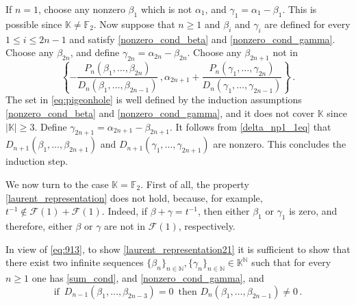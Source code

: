 \documentclass[a4paper,12pt]{article}
\def\bbf{\mathbb{F}}
\def\fq{\bbk}
\def\bbn{\mathbb{N}}
\def\bbk{\mathbb{K}}
\def\calf{\mathcal{F}}
\newcommand{\HankelPolynomial}{D}
\begin{document}
If $n=1$, choose any nonzero $\beta_1$ which is not $\alpha_1$, and $\gamma_1=\alpha_1-\beta_1$. This is possible since $\fq\neq\bbf_2$. Now 
suppose that $n\geq1$ and $\beta_i$ and $\gamma_i$ are defined for every $1\le i\le 2n-1$ and satisfy \eqref{nonzero_cond_beta} and \eqref{nonzero_cond_gamma}. Choose any $\beta_{2n}$, and define $\gamma_{2n}=\alpha_{2n}-\beta_{2n}$. Choose any $\beta_{2n+1}$ not in
\begin{equation}\label{eq:pigeonhole}
    \left\{-\frac{P_n(\beta_1,\ldots,\beta_{2n})}{\HankelPolynomial_{n}(\beta_1,\ldots,\beta_{2n-1})}\,,
    \alpha_{2n+1}+\frac{P_n(\gamma_1,\ldots,\gamma_{2n})}{\HankelPolynomial_{n}(\gamma_1,\ldots,\gamma_{2n-1})}\right\} \,.
\end{equation}
The set in \eqref{eq:pigeonhole} is well defined by the induction assumptions \eqref{nonzero_cond_beta} and \eqref{nonzero_cond_gamma}, and it does not cover $\fq$ since $|\fq|\geq3$. Define $\gamma_{2n+1} = \alpha_{2n+1} - \beta_{2n+1}$. It follows from \eqref{delta_np1_1eq} that $\HankelPolynomial_{n+1}(\beta_1,\ldots,\beta_{2n+1})$ and $\HankelPolynomial_{n+1}(\gamma_1,\ldots,\gamma_{2n+1})$ are nonzero.
This concludes the induction step.

We now turn to the case $\fq=\bbf_2$. First of all, the property \eqref{laurent_representation} does not hold, because, for example, $t^{-1}\notin\calf(1)+\calf(1)$. Indeed, if $\beta+\gamma = t^{-1}$, then either $\beta_1$ or $\gamma_1$ is zero, and therefore, either $\beta$ or $\gamma$ are not in $\calf(1)$, respectively. 

In view of \eqref{eq:913}, to show \eqref{laurent_representation21} it is sufficient to show that there exist two infinite sequences $\{\beta_n\}_{n\in\bbn},\{\gamma_n\}_{n\in\bbn}\in\fq^\bbn$ such that for every $n\ge 1$ one has \eqref{sum_cond}, and \eqref{nonzero_cond_gamma}, and 
\begin{equation}\label{eq:f2}
    \textrm{if }\,D_{n-1}(\beta_1,\ldots,\beta_{2n-3})=0\, \textrm{ then } D_{n}(\beta_1,\ldots,\beta_{2n-1})\neq0\,.
\end{equation}
\end{document}
